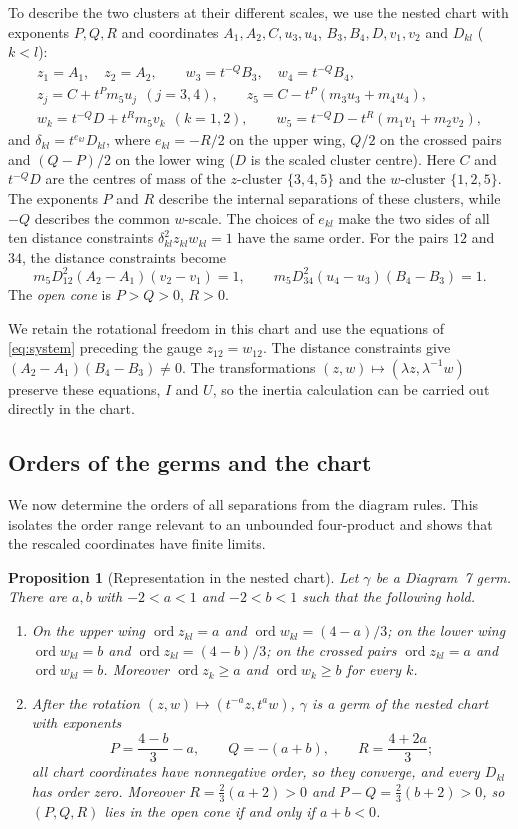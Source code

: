 \documentclass[Threeside,11pt]{article}
\newtheorem{proposition}[theorem]{Proposition}
\theoremstyle{definition}
\theoremstyle{remark}
\numberwithin{equation}{section}
\theoremstyle{remark}
\newcommand{\ord}{\operatorname{ord}}
\newenvironment{romanlist}{\begin{enumerate}\renewcommand{\labelenumi}{(\roman{enumi})}%
  \renewcommand{\theenumi}{\roman{enumi}}}{\end{enumerate}}
\begin{document}
To describe the two clusters at their different scales, we use the nested chart
with exponents $P,Q,R$ and coordinates $A_1,A_2,C,u_3,u_4$,
$B_3,B_4,D,v_1,v_2$ and $D_{kl}$ ($k<l$):
\begin{gather*}
  z_1=A_1,\quad z_2=A_2,\qquad w_3=t^{-Q}B_3,\quad w_4=t^{-Q}B_4,\\
  z_j=C+t^Pm_5u_j\ \ (j=3,4),\qquad z_5=C-t^P(m_3u_3+m_4u_4),\\
  w_k=t^{-Q}D+t^Rm_5v_k\ \ (k=1,2),\qquad w_5=t^{-Q}D-t^R(m_1v_1+m_2v_2),
\end{gather*}
and $\delta_{kl}=t^{e_{kl}}D_{kl}$, where $e_{kl}=-R/2$ on the upper wing, $Q/2$ on the crossed
pairs and $(Q-P)/2$ on the lower wing ($D$ is the scaled cluster centre).
Here $C$ and $t^{-Q}D$ are the centres of mass of the $z$-cluster $\{3,4,5\}$ and
the $w$-cluster $\{1,2,5\}$.  The exponents $P$ and $R$ describe the internal separations
of these clusters, while $-Q$ describes the common $w$-scale.  The choices of $e_{kl}$
make the two sides of all ten distance constraints $\delta_{kl}^2z_{kl}w_{kl}=1$ have the same order.
For the pairs $12$ and $34$, the distance constraints become
\[
  m_5D_{12}^2(A_2-A_1)(v_2-v_1)=1,\qquad m_5D_{34}^2(u_4-u_3)(B_4-B_3)=1.
\]
The \emph{open cone} is $P>Q>0$, $R>0$.

We retain the rotational freedom in this chart and use the equations of
\eqref{eq:system} preceding the gauge $z_{12}=w_{12}$.
The distance constraints give
$(A_2-A_1)(B_4-B_3)\ne0$.
The transformations $(z,w)\mapsto(\lambda z,\lambda^{-1}w)$ preserve these
equations, $I$ and $U$, so the inertia calculation can be carried out directly
in the chart.

\subsection{Orders of the germs and the chart}
We now determine the orders of all separations from the diagram rules.
This isolates the order range relevant to an unbounded four-product and shows that the
rescaled coordinates have finite limits.

\begin{proposition}[Representation in the nested chart]\label{d7-cover}
Let $\gamma$ be a Diagram~7 germ.  There are $a,b$ with $-2<a<1$ and $-2<b<1$ such that the
following hold.
\begin{romanlist}
  \item On the upper wing $\ord z_{kl}=a$ and $\ord w_{kl}=(4-a)/3$; on the lower wing
  $\ord w_{kl}=b$ and $\ord z_{kl}=(4-b)/3$; on the crossed pairs $\ord z_{kl}=a$ and
  $\ord w_{kl}=b$.  Moreover $\ord z_k\ge a$ and $\ord w_k\ge b$ for every $k$.
  \item After the rotation $(z,w)\mapsto(t^{-a}z,t^{a}w)$, $\gamma$ is a germ of the nested
  chart with exponents
  \[
    P=\frac{4-b}{3}-a,\qquad Q=-(a+b),\qquad R=\frac{4+2a}{3};
  \]
  all chart coordinates have nonnegative order, so they converge, and every $D_{kl}$ has order
  zero.  Moreover $R=\frac23(a+2)>0$ and $P-Q=\frac23(b+2)>0$, so $(P,Q,R)$ lies in the open
  cone if and only if $a+b<0$.
\end{romanlist}
\end{proposition}
\end{document}
